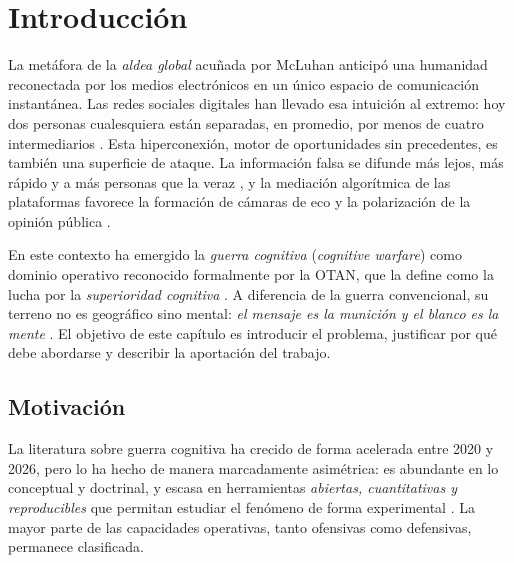 \documentclass[12pt]{extarticle}
\numberwithin{equation}{section}
\begin{document}
\newpage
{}

\listoffigures

\newpage

\listoftables

\newpage



\section{Introducci\'on}

La met\'afora de la \emph{aldea global} acu\~nada por McLuhan \cite{McLuhan1964} anticip\'o una humanidad reconectada por los medios electr\'onicos en un \'unico espacio de comunicaci\'on instant\'anea. Las redes sociales digitales han llevado esa intuici\'on al extremo: hoy dos personas cualesquiera est\'an separadas, en promedio, por menos de cuatro intermediarios \cite{Backstrom2012}. Esta hiperconexi\'on, motor de oportunidades sin precedentes, es tambi\'en una superficie de ataque. La informaci\'on falsa se difunde m\'as lejos, m\'as r\'apido y a m\'as personas que la veraz \cite{Vosoughi2018}, y la mediaci\'on algor\'itmica de las plataformas favorece la formaci\'on de c\'amaras de eco y la polarizaci\'on de la opini\'on p\'ublica \cite{DelVicario2016}.

En este contexto ha emergido la \emph{guerra cognitiva} (\emph{cognitive warfare}) como dominio operativo reconocido formalmente por la OTAN, que la define como la lucha por la \emph{superioridad cognitiva} \cite{NATOChiefScientist2025}. A diferencia de la guerra convencional, su terreno no es geogr\'afico sino mental: \emph{el mensaje es la munici\'on y el blanco es la mente} \cite{Hoffman2025}. El objetivo de este cap\'itulo es introducir el problema, justificar por qu\'e debe abordarse y describir la aportaci\'on del trabajo.

\subsection{Motivaci\'on}

La literatura sobre guerra cognitiva ha crecido de forma acelerada entre 2020 y 2026, pero lo ha hecho de manera marcadamente asim\'etrica: es abundante en lo conceptual y doctrinal, y escasa en herramientas \emph{abiertas, cuantitativas y reproducibles} que permitan estudiar el fen\'omeno de forma experimental \cite{DeppeSchaal2024}. La mayor parte de las capacidades operativas, tanto ofensivas como defensivas, permanece clasificada.
\end{document}
